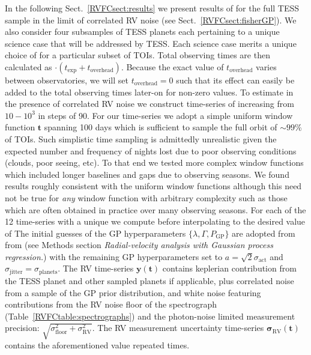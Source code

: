 In the following Sect.~\ref{RVFCsect:results} we present results of \nrv{} for the full TESS sample in the
limit of correlated RV noise (see Sect.~\ref{RVFCsect:fisherGP}). We also consider four subsamples of TESS
planets each pertaining to a unique science case that will be
addressed by TESS. Each science case merits a unique choice of \sigK{} for a
particular subset of TOIs. Total observing times are then calculated as 
\nrv{}$\cdot (t_{\text{exp}}+t_{\text{overhead}})$. Because the exact value of $t_{\text{overhead}}$ varies
between observatories, we will set $t_{\text{overhead}}=0$ such that its effect can easily
be added to the total observing times later-on for non-zero values. To estimate \nrv{} in the presence
of correlated RV noise we construct time-series of increasing \nrv{} from $10-10^3$ in steps of 90.
For our time-series we adopt a simple uniform window function $\mathbf{t}$ spanning 100 days
which is sufficient to sample the full orbit of $\sim 99$\% of TOIs. Such simplistic
time sampling is admittedly unrealistic given the expected number and frequency of nights
lost due to poor observing conditions (clouds, poor seeing, etc). To that end we
tested more complex window functions 
which included longer baselines and gaps due to observing seasons.
We found results roughly consistent with the uniform window
functions although this need not be true for \emph{any} window function with arbitrary complexity
such as those which are often obtained in practice over many observing seasons.
For each of the 12 time-series with a unique \nrv{} we compute \sigK{} before
interpolating \nrv{(}\sigK{)} to the desired value of  The
initial guesses of the GP hyperparameters $\{\lambda, \Gamma, P_{\text{GP}} \}$ are adopted from
from \cite{dittmann17a} (see Methods section \emph{Radial-velocity analysis with Gaussian process regression.})
with the remaining GP hyperparameters set to $a=\sqrt{2}\sigma_{\text{act}}$ and
$\sigma_{\text{jitter}}=\sigma_{\text{planets}}$. The RV time-series $\mathbf{y}(\mathbf{t})$
contains keplerian contribution from the
TESS planet and other sampled planets if applicable, plus correlated noise from a sample of the GP prior
distribution, and white noise featuring contributions from the RV noise floor of the spectrograph  
(Table~\ref{RVFCtable:spectrographs}) and the photon-noise limited measurement precision:
$\sqrt{\sigma_{\text{floor}}^2 + \sigma_{\text{RV}}^2}$. 
The RV measurement uncertainty time-series $\boldsymbol{\sigma}_{\text{RV}}(\mathbf{t})$
contains the aforementioned value repeated \nrv{} times.


